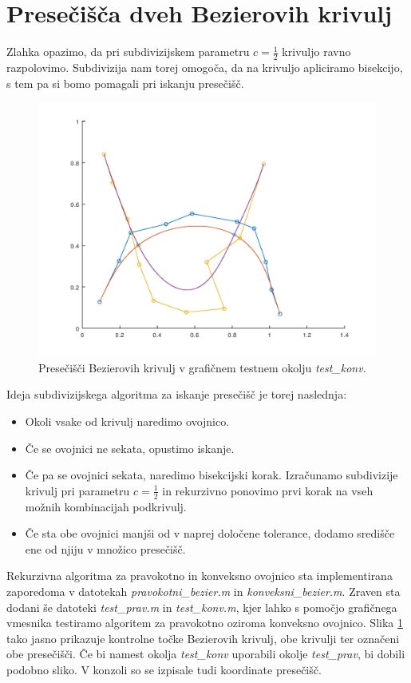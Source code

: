 \documentclass[a4paper, 12pt]{article} %
\begin{document}
\section{Presečišča dveh Bezierovih krivulj}

Zlahka opazimo, da pri subdivizijskem parametru $c = \frac{1}{2}$ krivuljo ravno razpolovimo. Subdivizija nam torej omogoča, da na krivuljo apliciramo bisekcijo, s tem pa si bomo pomagali pri iskanju presečišč.
\begin{figure}[h!]
	\centering
	\includegraphics[scale=0.55]{konv}
	\caption{Presečišči Bezierovih krivulj v grafičnem testnem okolju \emph{test\_konv}.}
	\label{fig:konv}
\end{figure}

Ideja subdivizijskega algoritma za iskanje presečišč je torej naslednja:
\begin{itemize}
\item Okoli vsake od krivulj naredimo ovojnico.
\item Če se ovojnici ne sekata, opustimo iskanje.
\item Če pa se ovojnici sekata, naredimo bisekcijski korak. Izračunamo subdivizije krivulj pri parametru $c = \frac{1}{2}$ in rekurzivno ponovimo prvi korak na vseh možnih kombinacijah podkrivulj.
\item Če sta obe ovojnici manjši od v naprej določene tolerance, dodamo središče ene od njiju v množico presečišč.
\end{itemize}


Rekurzivna algoritma za pravokotno in konveksno ovojnico sta implementirana zaporedoma v datotekah \emph{pravokotni\_bezier.m} in \emph{konveksni\_bezier.m}.
Zraven sta dodani še datoteki \emph{test\_prav.m} in \emph{test\_konv.m}, kjer lahko s pomočjo grafičnega vmesnika testiramo algoritem za pravokotno oziroma konveksno ovojnico.
Slika \ref{fig:konv} tako jasno prikazuje kontrolne točke Bezierovih krivulj, obe krivulji ter označeni obe presečišči. Če bi namest okolja \emph{test\_konv} uporabili okolje \emph{test\_prav}, bi dobili podobno sliko. V konzoli so se izpisale tudi koordinate presečišč.
\end{document}
